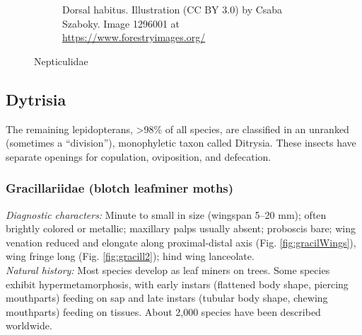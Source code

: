 \documentclass[letterpaper, 11pt]{article}
\begin{document}
\begin{figure}[ht!]
\begin{subfigure}[ht!]{0.45\textwidth}
        \caption{Dorsal habitus. Illustration (CC BY 3.0) by Csaba Szaboky. Image 1296001 at \url{https://www.forestryimages.org/}}
        \label{fig:nepticulid1}
    \end{subfigure}
    \caption{Nepticulidae}\label{fig:nepticulids}
\end{figure}

\subsection{Dytrisia}
The remaining lepidopterans, \textgreater98\% of all species, are classified in an unranked (sometimes a ``division''), monophyletic taxon called Ditrysia. These insects have separate openings for copulation, oviposition, and defecation.

\subsubsection{Gracillariidae (blotch leafminer moths)}
\noindent{}\textit{Diagnostic characters:} Minute to small in size (wingspan 5--20 mm); often brightly colored or metallic; maxillary palps usually absent; proboscis bare; wing venation reduced and elongate along proximal-distal axis (Fig. \ref{fig:gracilWings}), wing fringe long (Fig. \ref{fig:gracill2}); hind wing lanceolate.\\

\noindent{}\textit{Natural history:} Most species develop as leaf miners on trees. Some species exhibit hypermetamorphosis, with early instars (flattened body shape, piercing mouthparts) feeding on sap and late instars (tubular body shape, chewing mouthparts) feeding on tissues. About 2,000 species have been described worldwide.
\end{document}
